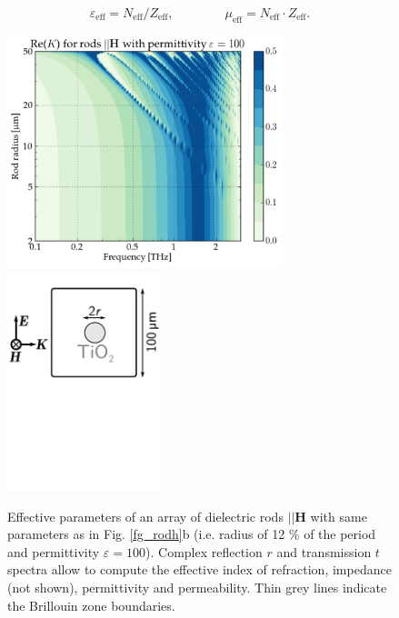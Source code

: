 {\begin{equation} \varepsilon_{\text{eff}} = N_{\text{eff}}/Z_{\text{eff}}, \quad\quad\quad\quad \mu_{\text{eff}} = N_{\text{eff}}\cdot Z_{\text{eff}}.
\label{eq_epsmu}\end{equation}

\begin{figure}[ht]  \caption{Effective parameters of an array of dielectric rods $||\mathbf H$ with same parameters as in Fig. \ref{fg_rodh}b (i.e. radius of  12 \% of the period and permittivity $\varepsilon = 100$). Complex reflection $r$ and transmission $t$ spectra allow to compute the effective index of refraction, impedance (not shown), permittivity and permeability. Thin grey lines indicate the Brillouin zone boundaries.}
\label{fg_rodh_fdtd} \centering 
\includegraphics[width=8cm]{img/old/HRods_eps100_radiusscan.pdf}
\includegraphics[width=4.5cm]{img/HRods_sketch.pdf}
\end{figure}


}
